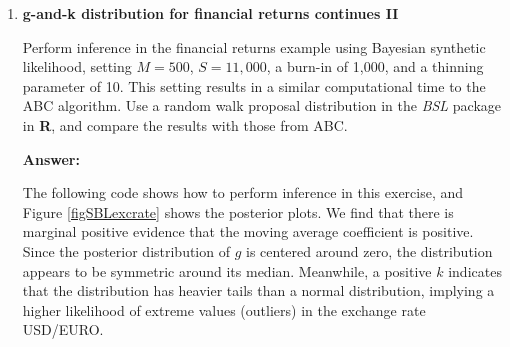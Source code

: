 \begin{enumerate}[leftmargin=*]
\begin{tcolorbox}[enhanced,width=4.67in,center upper,
	fontupper=\large\bfseries,drop shadow southwest,sharp corners]
\begin{VF}
\begin{lstlisting}[language=R]
df2 <- data.frame(Value = c(PostABC_AR[1:Sp,4], PostABC_ARown[1:Sp,4], PostABC_ARownRegAd[1:Sp,4]), Distribution = factor(c(rep("EasyABC", Sp), rep("ABC", Sp), rep("ABCAdj", Sp))))
deng <- ggplot(df2, aes(x = Value, color = Distribution)) +   geom_density(linewidth = 1) + geom_vline(xintercept = g, linetype = "dashed", color = "red", linewidth = 1) + labs(title = TeX("Posterior density plot: g"), x = TeX("$g$"), y = "Posterior density") +
scale_color_manual(values = c("blue", "red", "green")) +  theme_minimal() + theme(legend.title = element_blank())

df3 <- data.frame(Value = c(PostABC_AR[1:Sp,5], PostABC_ARown[1:Sp,5], PostABC_ARownRegAd[1:Sp,5]), Distribution = factor(c(rep("EasyABC", Sp), rep("ABC", Sp), rep("ABCAdj", Sp))))
denk <- ggplot(df3, aes(x = Value, color = Distribution)) +   geom_density(linewidth = 1) + geom_vline(xintercept = k, linetype = "dashed", color = "red", linewidth = 1) +
labs(title = TeX("Posterior density plot: k"), x = TeX("$k$"), y = "Posterior density") +
scale_color_manual(values = c("blue", "red", "green")) +  theme_minimal() + theme(legend.title = element_blank())

library(ggpubr)
ggarrange(dentheta, deng, denk, labels = c("A", "B", "C"), ncol = 3, nrow = 1,
legend = "bottom", common.legend = TRUE)
\end{lstlisting}
	\end{VF}
\end{tcolorbox}

\item \textbf{g-and-k distribution for financial returns continues II}

Perform inference in the financial returns example using Bayesian synthetic likelihood, setting $M=500$, $S=11,000$, a burn-in of 1,000, and a thinning parameter of 10. This setting results in a similar computational time to the ABC algorithm. Use a random walk proposal distribution in the \textit{BSL} package in \textbf{R}, and compare the results with those from ABC.

\textbf{Answer:}

The following code shows how to perform inference in this exercise, and Figure \ref{figSBLexcrate} shows the posterior plots. We find that there is marginal positive evidence that the moving average coefficient is positive. Since the posterior distribution of $g$ is centered around zero, the distribution appears to be symmetric around its median. Meanwhile, a positive $k$ indicates that the distribution has heavier tails than a normal distribution, implying a higher likelihood of extreme values (outliers) in the exchange rate USD/EURO. 


\end{enumerate}
